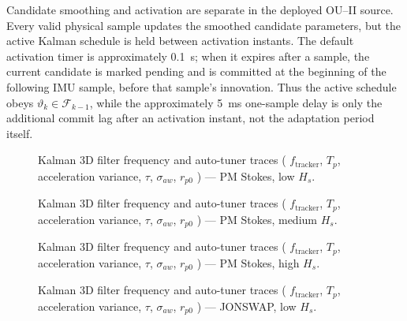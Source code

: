 \documentclass[11pt,letterpaper]{article}
\begin{document}
Candidate smoothing and activation are separate in the deployed OU--II source.
Every valid physical sample updates the smoothed candidate parameters, but the
active Kalman schedule is held between activation instants.  The default
activation timer is approximately \SI{0.1}{s}; when it expires after a sample,
the current candidate is marked pending and is committed at the beginning of
the following IMU sample, before that sample's innovation.  Thus the active
schedule obeys $\vartheta_k\in\mathcal F_{k-1}$, while the approximately
\SI{5}{ms} one-sample delay is only the additional commit lag after an
activation instant, not the adaptation period itself.



    \begin{figure}[H]\centering
    \resizebox{\textwidth}{!}{}
    \caption{Kalman 3D filter frequency and auto-tuner traces ( $f_{\mathrm{tracker}}$, $T_p$, acceleration variance, $\tau$, $\sigma_{aw}$, $r_{p0}$ ) — PM Stokes, low $H_s$.}
    \label{fig:w3d_ou2_pmstokes_low_tuner}
    \end{figure}

    \begin{figure}[H]\centering
    \resizebox{\textwidth}{!}{}
    \caption{Kalman 3D filter frequency and auto-tuner traces ( $f_{\mathrm{tracker}}$, $T_p$, acceleration variance, $\tau$, $\sigma_{aw}$, $r_{p0}$ ) — PM Stokes, medium $H_s$.}
    \label{fig:w3d_ou2_pmstokes_medium_tuner}
    \end{figure}

    \begin{figure}[H]\centering
    \resizebox{\textwidth}{!}{}
    \caption{Kalman 3D filter frequency and auto-tuner traces ( $f_{\mathrm{tracker}}$, $T_p$, acceleration variance, $\tau$, $\sigma_{aw}$, $r_{p0}$ ) — PM Stokes, high $H_s$.}
    \label{fig:w3d_ou2_pmstokes_high_tuner}
    \end{figure}

    \begin{figure}[H]\centering
    \resizebox{\textwidth}{!}{}
    \caption{Kalman 3D filter frequency and auto-tuner traces ( $f_{\mathrm{tracker}}$, $T_p$, acceleration variance, $\tau$, $\sigma_{aw}$, $r_{p0}$ ) — JONSWAP, low $H_s$.}
    \label{fig:w3d_ou2_jonswap_low_tuner}
    \end{figure}
\end{document}
